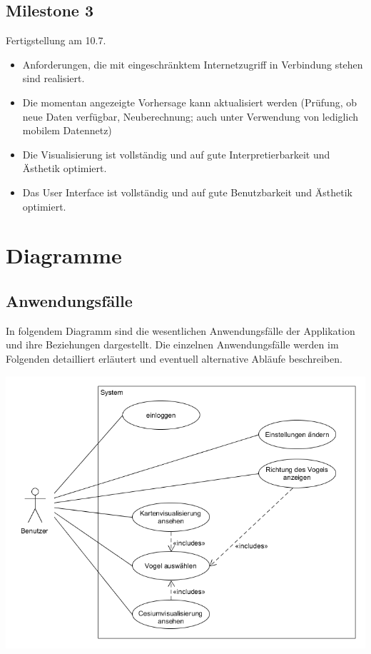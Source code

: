 \documentclass[12pt]{article} %
\begin{document}
\vspace{1em}

\subsection*{Milestone 3}
Fertigstellung am 10.7.
\begin{itemize} 
	\item Anforderungen, die mit eingeschränktem Internetzugriff in Verbindung stehen sind realisiert.
	\item Die momentan angezeigte Vorhersage kann aktualisiert werden (Prüfung, ob neue Daten verfügbar, Neuberechnung; auch unter Verwendung von lediglich mobilem Datennetz)
	\item Die Visualisierung ist vollständig und auf gute Interpretierbarkeit und Ästhetik optimiert.
	\item Das User Interface ist vollständig und auf gute Benutzbarkeit und Ästhetik optimiert.
\end{itemize} 



\newpage
\section{Diagramme} \label{diagramme}

\subsection{Anwendungsfälle}

In folgendem Diagramm sind die wesentlichen Anwendungsfälle der Applikation und ihre Beziehungen dargestellt. Die einzelnen Anwendungsfälle werden im Folgenden detailliert erläutert und eventuell alternative Abläufe beschreiben.

\includegraphics[width = 1\linewidth]{Usecasediagramm.png}
\end{document}
